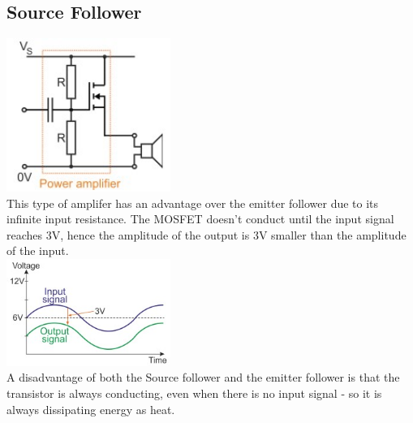 \documentclass[a4paper, 11pt, twocolumn]{article}
\begin{document}
    \subsection{Source Follower}
    \includegraphics[width=0.4\textwidth]{sourceFollower.jpg}\\
    This type of amplifer has an advantage over the emitter follower due to its infinite input resistance.
    The MOSFET doesn't conduct until the input signal reaches 3V, hence the amplitude of the output is 3V smaller than the amplitude of the input. \\
    \includegraphics[width=0.4\textwidth]{sourceFollowerOut.jpg}\\
    A disadvantage of both the Source follower and the emitter follower is that the transistor is always conducting, even when there is no input signal - so it is always dissipating energy as heat.
\end{document}
